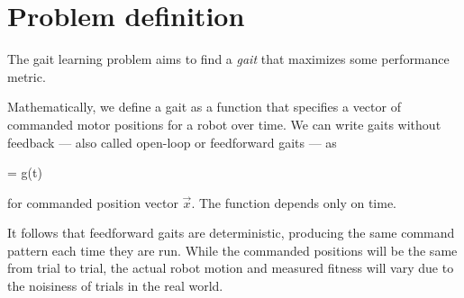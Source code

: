 \section{Problem definition}

%
%
%
%
%


The gait learning problem aims to find a \emph{gait} that maximizes
some performance metric.

Mathematically, we define a gait as a function that specifies
a vector of commanded motor positions for a robot over time.
We can write gaits without feedback --- also called open-loop or
feedforward gaits --- as

\be
{} = g(t)
\ee

\noindent for commanded position vector $\vec{x}$.  The
function depends only on time.

%
%

It follows that feedforward gaits are deterministic, producing the
same command pattern each time they are run.  While the commanded
positions will be the same from trial to trial, the actual robot
motion and measured fitness will vary due to the noisiness of trials
in the real world.

